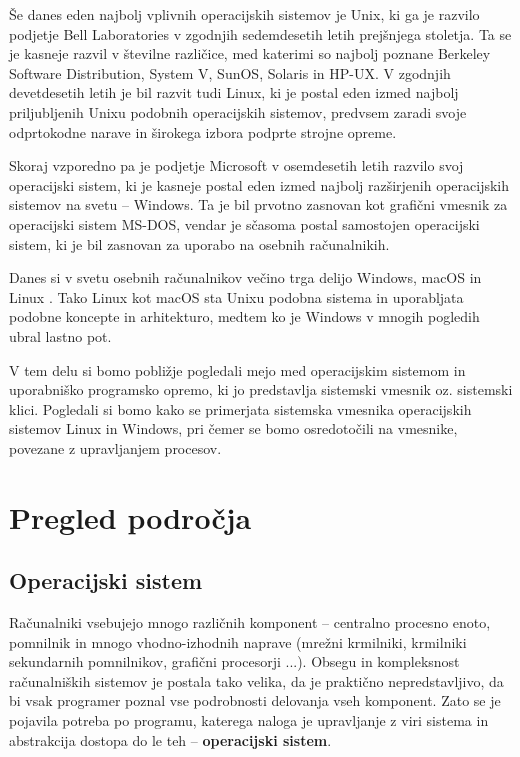 \documentclass[a4paper,12pt,openright]{book}
\begin{document}
Še danes eden najbolj vplivnih operacijskih sistemov je Unix, ki ga je razvilo podjetje Bell Laboratories v zgodnjih sedemdesetih letih prejšnjega stoletja.
Ta se je kasneje razvil v številne različice, med katerimi so najbolj poznane Berkeley Software Distribution, System V, SunOS, Solaris in HP-UX.
V zgodnjih devetdesetih letih je bil razvit tudi Linux, ki je postal eden izmed najbolj priljubljenih Unixu podobnih operacijskih sistemov, predvsem zaradi svoje odprtokodne narave in širokega izbora podprte strojne opreme.

Skoraj vzporedno pa je podjetje Microsoft v osemdesetih letih razvilo svoj operacijski sistem, ki je kasneje postal eden izmed najbolj razširjenih operacijskih sistemov na svetu -- Windows.
Ta je bil prvotno zasnovan kot grafični vmesnik za operacijski sistem MS-DOS, vendar je sčasoma postal samostojen operacijski sistem, ki je bil zasnovan za uporabo na osebnih računalnikih.

Danes si v svetu osebnih računalnikov večino trga delijo Windows, macOS in Linux \cite{Statcounter_OS_2024}.
Tako Linux kot macOS sta Unixu podobna sistema in uporabljata podobne koncepte in arhitekturo, medtem ko je Windows v mnogih pogledih ubral lastno pot.

V tem delu si bomo pobližje pogledali mejo med operacijskim sistemom in uporabniško programsko opremo, ki jo predstavlja sistemski vmesnik oz. sistemski klici.
Pogledali si bomo kako se primerjata sistemska vmesnika operacijskih sistemov Linux in Windows, pri čemer se bomo osredotočili na vmesnike, povezane z upravljanjem procesov.

\chapter{Pregled področja}

\section{Operacijski sistem}

Računalniki vsebujejo mnogo različnih komponent -- centralno procesno enoto, pomnilnik in mnogo vhodno-izhodnih naprave (mrežni krmilniki, krmilniki sekundarnih pomnilnikov, grafični procesorji ...).
Obsegu in kompleksnost računalniških sistemov je postala tako velika, da je praktično nepredstavljivo, da bi vsak programer poznal vse podrobnosti delovanja vseh komponent.
Zato se je pojavila potreba po programu, katerega naloga je upravljanje z viri sistema in abstrakcija dostopa do le teh -- \textbf{operacijski sistem}.
\end{document}
